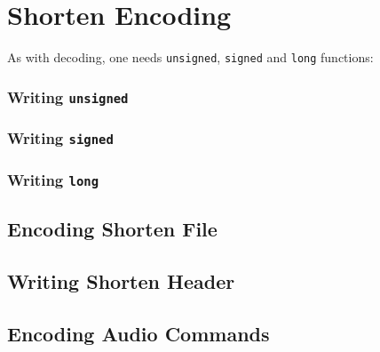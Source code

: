 
\section{Shorten Encoding}
As with decoding, one needs \texttt{unsigned}, \texttt{signed} and \texttt{long}
functions:

\subsubsection{Writing \texttt{unsigned}}
\label{shorten:write_unsigned}
{
  
}


\subsubsection{Writing \texttt{signed}}
\label{shorten:write_signed}
{
  
}


\subsubsection{Writing \texttt{long}}
\label{shorten:write_long}
{
  
}


\clearpage

\subsection{Encoding Shorten File}
{
  
}

\clearpage

\subsection{Writing Shorten Header}
\label{shorten:write_header}


\clearpage

\subsection{Encoding Audio Commands}
\label{shorten:encode_audio}
{
  
}


